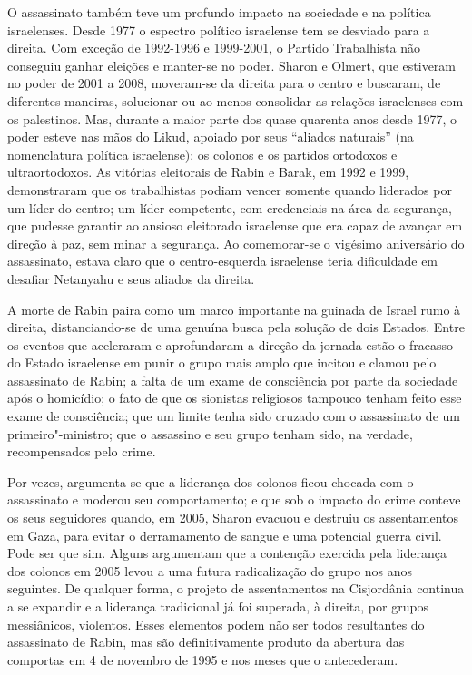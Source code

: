 O assassinato também teve um profundo impacto na sociedade e na política
israelenses. Desde 1977 o espectro político israelense tem se desviado
para a direita. Com exceção de 1992-1996 e 1999-2001, o Partido Trabalhista
não conseguiu ganhar eleições e manter-se no poder. Sharon e Olmert, que
estiveram no poder de 2001 a 2008, moveram-se da direita para o centro e
buscaram, de diferentes maneiras, solucionar ou ao menos consolidar as
relações israelenses com os palestinos. Mas, durante a maior parte dos
quase quarenta anos desde 1977, o poder esteve nas mãos do Likud, apoiado por
seus ``aliados naturais'' (na nomenclatura política israelense): os
colonos e os partidos ortodoxos e ultraortodoxos. As vitórias
eleitorais de Rabin e Barak, em 1992 e 1999, demonstraram que os
trabalhistas podiam vencer somente quando liderados por um líder do
centro; um líder competente, com credenciais na área da segurança, que
pudesse garantir ao ansioso eleitorado israelense que era capaz de
avançar em direção à paz, sem minar a segurança. Ao comemorar-se o
vigésimo aniversário do assassinato, estava claro que o centro-esquerda
israelense teria dificuldade em desafiar Netanyahu e seus aliados da
direita.

A morte de Rabin paira como um marco importante na guinada de
Israel rumo à direita, distanciando-se de uma genuína busca pela solução
de dois Estados. Entre os eventos que aceleraram e aprofundaram a
direção da jornada estão o fracasso do Estado israelense em punir o
grupo mais amplo que incitou e clamou pelo assassinato de Rabin; a falta
de um exame de consciência por parte da sociedade após o homicídio;
o fato de que os sionistas religiosos tampouco tenham feito esse exame de consciência; 
que um limite tenha sido cruzado com o assassinato de um primeiro"-ministro; que
o assassino e seu grupo tenham sido, na verdade, recompensados pelo
crime.

Por vezes, argumenta-se que a liderança dos colonos ficou chocada com o
assassinato e moderou seu comportamento; e que sob o impacto do crime
conteve os seus seguidores quando, em 2005, Sharon evacuou e destruiu os
assentamentos em Gaza, para evitar o derramamento de sangue e uma
potencial guerra civil. Pode ser que sim. Alguns argumentam que a contenção
exercida pela liderança dos colonos em 2005 levou a uma futura
radicalização do grupo nos anos seguintes. De qualquer forma, o projeto
de assentamentos na Cisjordânia continua a se expandir e a liderança
tradicional já foi superada, à direita, por grupos messiânicos,
violentos. Esses elementos podem não ser todos resultantes do
assassinato de Rabin, mas são definitivamente produto da abertura das
comportas em 4 de novembro de 1995 e nos meses que o antecederam.

